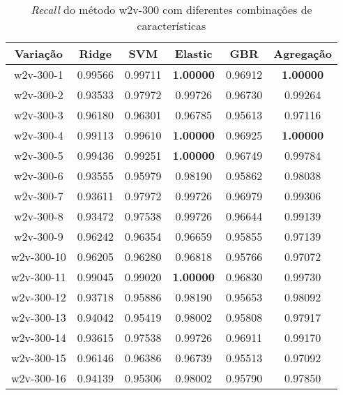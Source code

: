 \begin{table}[H]
\centering
\begin{tabular}{|c| c c  c  c  c| }
\hline
Variação &  Ridge & SVM & Elastic & GBR & Agregação  \\ 
\hline
w2v-300-1 & 0.99566 & 0.99711 & \textbf{1.00000} & 0.96912 & \textbf{1.00000} \\
\hline
w2v-300-2 & 0.93533 & 0.97972 & 0.99726 & 0.96730 & 0.99264 \\
\hline
w2v-300-3 & 0.96180 & 0.96301 & 0.96785 & 0.95613 & 0.97116 \\
\hline
w2v-300-4 & 0.99113 & 0.99610 & \textbf{1.00000} & 0.96925 & \textbf{1.00000} \\
\hline
w2v-300-5 & 0.99436 & 0.99251 & \textbf{1.00000} & 0.96749 & 0.99784 \\
\hline
w2v-300-6 & 0.93555 & 0.95979 & 0.98190 & 0.95862 & 0.98038 \\
\hline
w2v-300-7 & 0.93611 & 0.97972 & 0.99726 & 0.96979 & 0.99306 \\
\hline
w2v-300-8 & 0.93472 & 0.97538 & 0.99726 & 0.96644 & 0.99139 \\
\hline
w2v-300-9 & 0.96242 & 0.96354 & 0.96659 & 0.95855 & 0.97139 \\
\hline
w2v-300-10 & 0.96205 & 0.96280 & 0.96818 & 0.95766 & 0.97072 \\
\hline
w2v-300-11 & 0.99045 & 0.99020 & \textbf{1.00000} & 0.96830 & 0.99730 \\
\hline
w2v-300-12 & 0.93718 & 0.95886 & 0.98190 & 0.95653 & 0.98092 \\
\hline
w2v-300-13 & 0.94042 & 0.95419 & 0.98002 & 0.95808 & 0.97917 \\
\hline
w2v-300-14 & 0.93615 & 0.97538 & 0.99726 & 0.96911 & 0.99170 \\
\hline
w2v-300-15 & 0.96146 & 0.96386 & 0.96739 & 0.95513 & 0.97092 \\
\hline
w2v-300-16 & 0.94139 & 0.95306 & 0.98002 & 0.95790 & 0.97850 \\
\hline
\end{tabular}
\caption{\textit{Recall} do método w2v-300 com diferentes combinações de características}
\label{tab:recallw2v300}
\end{table}


